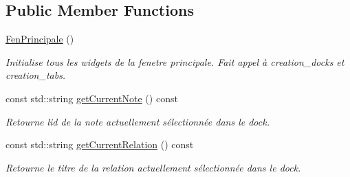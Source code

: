 \subsection*{Public Member Functions}
\begin{DoxyCompactItemize}
\item 
\mbox{\label{class_fen_principale_a529a35ea032da250ad37f7355d1388be}} 
\hyperlink{class_fen_principale_a529a35ea032da250ad37f7355d1388be}{Fen\+Principale} ()
\begin{DoxyCompactList}\small\item\em Initialise tous les widgets de la fenetre principale. Fait appel à creation\+\_\+docks et creation\+\_\+tabs. \end{DoxyCompactList}\item 
\mbox{\label{class_fen_principale_a693e4a09cc7dd941184d0ea7860409da}} 
const std\+::string \hyperlink{class_fen_principale_a693e4a09cc7dd941184d0ea7860409da}{get\+Current\+Note} () const
\begin{DoxyCompactList}\small\item\em Retourne l\textquotesingle{}id de la note actuellement sélectionnée dans le dock. \end{DoxyCompactList}\item 
\mbox{\label{class_fen_principale_afe1f6fbbdd799fa55e804343ce4583af}} 
const std\+::string \hyperlink{class_fen_principale_afe1f6fbbdd799fa55e804343ce4583af}{get\+Current\+Relation} () const
\begin{DoxyCompactList}\small\item\em Retourne le titre de la relation actuellement sélectionnée dans le dock. \end{DoxyCompactList}\end{DoxyCompactItemize}
